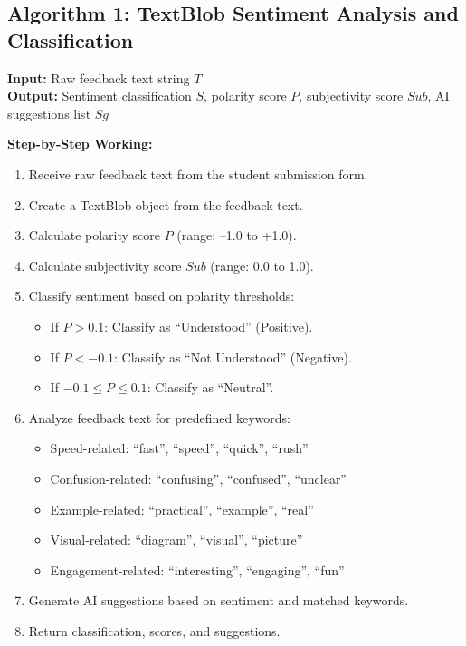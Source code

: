 \subsection{Algorithm 1: TextBlob Sentiment Analysis and Classification}

\textbf{Input:} Raw feedback text string $T$ \\
\textbf{Output:} Sentiment classification $S$, polarity score $P$, subjectivity score $Sub$, AI suggestions list $Sg$

\textbf{Step-by-Step Working:}

\begin{enumerate}
    \item Receive raw feedback text from the student submission form.
    \item Create a TextBlob object from the feedback text.
    \item Calculate polarity score $P$ (range: --1.0 to +1.0).
    \item Calculate subjectivity score $Sub$ (range: 0.0 to 1.0).
    \item Classify sentiment based on polarity thresholds:
    \begin{itemize}
        \item If $P > 0.1$: Classify as ``Understood'' (Positive).
        \item If $P < -0.1$: Classify as ``Not Understood'' (Negative).
        \item If $-0.1 \leq P \leq 0.1$: Classify as ``Neutral''.
    \end{itemize}
    \item Analyze feedback text for predefined keywords:
    \begin{itemize}
        \item Speed-related: ``fast'', ``speed'', ``quick'', ``rush''
        \item Confusion-related: ``confusing'', ``confused'', ``unclear''
        \item Example-related: ``practical'', ``example'', ``real''
        \item Visual-related: ``diagram'', ``visual'', ``picture''
        \item Engagement-related: ``interesting'', ``engaging'', ``fun''
    \end{itemize}
    \item Generate AI suggestions based on sentiment and matched keywords.
    \item Return classification, scores, and suggestions.
\end{enumerate}

